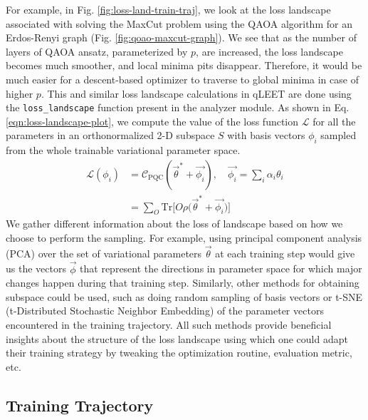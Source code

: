 \documentclass[%
 reprint,
 amsmath,
 amssymb,
 showkeys,
 pra,
 floatfix,
]{revtex4-2}
\begin{document}
For example, in Fig. \ref{fig:loss-land-train-traj}, we look at the loss landscape associated with solving the MaxCut problem using the QAOA algorithm \cite{2014arXiv1411.4028F} for an Erdos-Renyi graph (Fig. \ref{fig:qoao-maxcut-graph}). We see that as the number of layers of QAOA ansatz, parameterized by $p$, are increased, the loss landscape becomes much smoother, and local minima pits disappear. Therefore, it would be much easier for a descent-based optimizer to traverse to global minima in case of higher $p$. This and similar loss landscape calculations in qLEET are done using the \texttt{loss\_landscape} function present in the analyzer module. As shown in Eq. \ref{eqn:loss-landscape-plot}, we compute the value of the loss function $\mathcal{L}$ for all the parameters in an orthonormalized 2-D subspace $S$ with basis vectors $\phi_i$ sampled from the whole trainable variational parameter space. 
\begin{equation}\label{eqn:loss-landscape-plot}
    \begin{split}
        \mathcal{L}(\phi_i) 
        &= \mathcal{C}_{\text{PQC}}(\vec{\theta}^* + \vec{\phi_i}), \quad \vec{\phi_i} = \sum_i \alpha_i \theta_i\\ 
        &= \sum_{O} \text{Tr}\Bigg[O\rho \bigg(\vec{\theta}^* + \vec{\phi_i} \bigg) \Bigg]
    \end{split}
\end{equation}
We gather different information about the loss of landscape based on how we choose to perform the sampling. For example, using principal component analysis (PCA) over the set of variational parameters $\vec{\theta}$ at each training step would give us the vectors $\vec{\phi}$ that represent the directions in parameter space for which major changes happen during that training step. Similarly, other methods for obtaining subspace could be used, such as doing random sampling of basis vectors or t-SNE (t-Distributed Stochastic Neighbor Embedding) of the parameter vectors encountered in the training trajectory. All such methods provide beneficial insights about the structure of the loss landscape using which one could adapt their training strategy by tweaking the optimization routine, evaluation metric, etc. 

\subsection{Training Trajectory}
\end{document}

